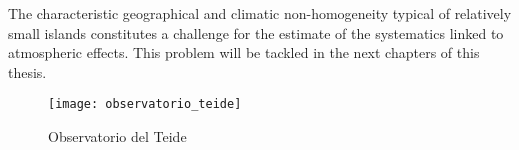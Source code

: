 The characteristic geographical and climatic non-homogeneity typical of
relatively small islands constitutes a challenge for the estimate of the
systematics linked to atmospheric effects. This problem will be tackled in
the next chapters of this thesis.



\begin{figure}
        \centering
        \texttt{[image: observatorio\_teide]}
        \caption{Observatorio del Teide}
        \label{fig:observatorio_teide}
\end{figure}

